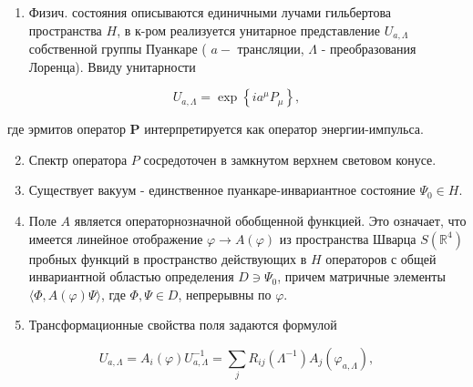 \documentclass[10pt]{article}
\begin{document}
\begin{enumerate}

  \item Физич. состояния описываются единичными лучами гильбертова пространства $H$, в к-ром реализуется унитарное представление $U_{a, \Lambda}$ собственной группы Пуанкаре ( $a-$ трансляции, $\Lambda$ - преобразования Лоренца). Ввиду унитарности

\end{enumerate}



\[

U_{a, \Lambda}=\exp \left\{i a^{\mu} P_{\mu}\right\},

\]



где эрмитов оператор $\boldsymbol{P}$ интерпретируется как оператор энергии-импульса.



\begin{enumerate}

  \setcounter{enumi}{1}

  \item Спектр оператора $P$ сосредоточен в замкнутом верхнем световом конусе.



  \item Существует вакуум - единственное пуанкаре-инвариантное состояние $\Psi_{0} \in H$.



  \item Поле $A$ является операторнозначной обобщенной функцией. Это означает, что имеется линейное отображение $\varphi \rightarrow A(\varphi)$ из пространства Шварца $S\left(\mathbb{R}^{4}\right)$ пробных функций в пространство действующих в $H$ операторов с общей инвариантной областью определения $D \ni \Psi_{0}$, причем матричные элементы $\langle\Phi, A(\varphi) \Psi\rangle$, где $\Phi, \Psi \in D$, непрерывны по $\varphi$.



  \item Трансформационные свойства поля задаются формулой



\end{enumerate}



\[

U_{a, \Lambda}=A_{i}(\varphi) U_{a, \Lambda}^{-1}=\sum_{j} R_{i j}\left(\Lambda^{-1}\right) A_{j}\left(\varphi_{a, \Lambda}\right),

\]
\end{document}

